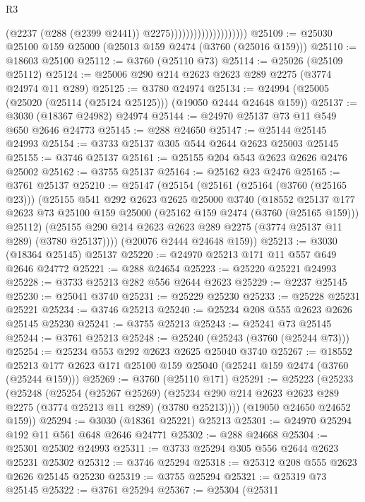 \begin{lexlean}{R3}
\begin{coremodule}
                                          (@2237 (@288 (@2399 @2441)) @2275))))))))))))))))))))
@25109 := @25030 @25100 @159 @25000 (@25013 @159 @2474 (@3760 (@25016 @159)))
@25110 := @18603 @25100
@25112 := @3760 (@25110 @73)
@25114 := @25026 (@25109 @25112)
@25124 := @25006 @290 @214 @2623 @2623 @289 @2275 (@3774 @24974 @11 @289)
@25125 := @3780 @24974
@25134 := @24994 (@25005 (@25020 (@25114 (@25124 @25125))) (@19050 @2444 @24648 @159))
@25137 := @3030 (@18367 @24982) @24974
@25144 := @24970 @25137 @73 @11 @549 @650 @2646 @24773
@25145 := @288 @24650
@25147 := @25144 @25145 @24993
@25154 := @3733 @25137 @305 @544 @2644 @2623 @25003 @25145
@25155 := @3746 @25137
@25161 := @25155 @204 @543 @2623 @2626 @2476 @25002
@25162 := @3755 @25137
@25164 := @25162 @23 @2476
@25165 := @3761 @25137
@25210 := @25147
    (@25154
      (@25161
        (@25164 (@3760 (@25165 @23)))
        (@25155
          @541
          @292
          @2623
          @2625
          @25000
          @3740
          (@18552
            @25137
            @177
            @2623
            @73
            @25100
            @159
            @25000
            (@25162 @159 @2474 (@3760 (@25165 @159)))
            @25112)
          (@25155 @290 @214 @2623 @2623 @289 @2275 (@3774 @25137 @11 @289) (@3780 @25137))))
      (@20076 @2444 @24648 @159))
@25213 := @3030 (@18364 @25145) @25137
@25220 := @24970 @25213 @171 @11 @557 @649 @2646 @24772
@25221 := @288 @24654
@25223 := @25220 @25221 @24993
@25228 := @3733 @25213 @282 @556 @2644 @2623
@25229 := @2237 @25145
@25230 := @25041 @3740
@25231 := @25229 @25230
@25233 := @25228 @25231 @25221
@25234 := @3746 @25213
@25240 := @25234 @208 @555 @2623 @2626 @25145 @25230
@25241 := @3755 @25213
@25243 := @25241 @73 @25145
@25244 := @3761 @25213
@25248 := @25240 (@25243 (@3760 (@25244 @73)))
@25254 := @25234 @553 @292 @2623 @2625 @25040 @3740
@25267 := @18552 @25213 @177 @2623 @171 @25100 @159 @25040 (@25241 @159 @2474 (@3760 (@25244 @159)))
@25269 := @3760 (@25110 @171)
@25291 := @25223
    (@25233
      (@25248
        (@25254
          (@25267 @25269)
          (@25234 @290 @214 @2623 @2623 @289 @2275 (@3774 @25213 @11 @289) (@3780 @25213))))
      (@19050 @24650 @24652 @159))
@25294 := @3030 (@18361 @25221) @25213
@25301 := @24970 @25294 @192 @11 @561 @648 @2646 @24771
@25302 := @288 @24668
@25304 := @25301 @25302 @24993
@25311 := @3733 @25294 @305 @556 @2644 @2623 @25231 @25302
@25312 := @3746 @25294
@25318 := @25312 @208 @555 @2623 @2626 @25145 @25230
@25319 := @3755 @25294
@25321 := @25319 @73 @25145
@25322 := @3761 @25294
@25367 := @25304
    (@25311

\end{coremodule}
\end{lexlean}
